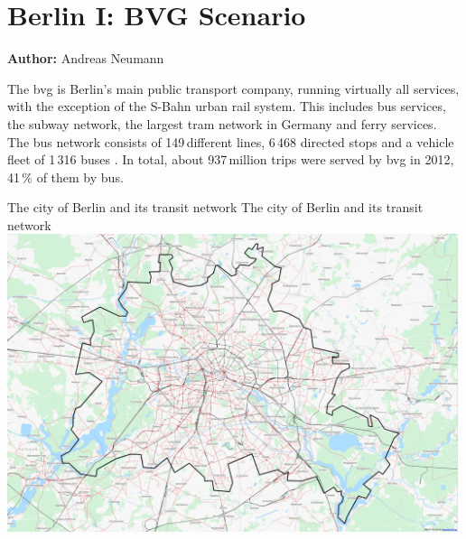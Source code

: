 \chapter{Berlin I: BVG Scenario}
\label{ch:berlinI}
\hfill \textbf{Author:} Andreas Neumann


The \gls{bvg} is Berlin's main public transport company, running virtually all services, with the exception of the S-Bahn urban rail system. This includes bus services, the subway network, the largest tram network in Germany and ferry services. The bus network consists of 149\,different lines, 6\,468 directed stops and a vehicle fleet of 1\,316 buses \citep{BVG2012}. In total, about 937\,million trips were served by \gls{bvg} in 2012, 41\,\% of them by bus.

\createfigure%
{The city of Berlin and its transit network}%
{The city of Berlin and its transit network}%
{\label{fig:scenario_berlin_i}}%
{\includegraphics[width=0.99\textwidth, angle=0]{scenarios/figures/berlin_pt}}%
{}

